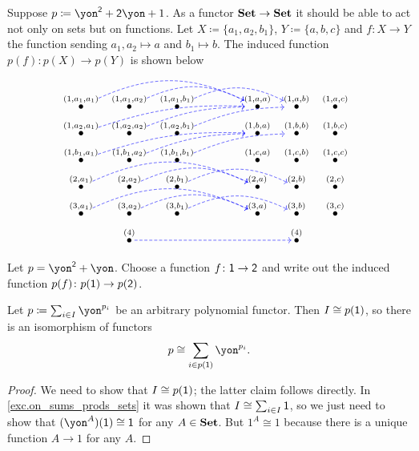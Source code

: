 \documentclass[DynamicalBook]{subfiles}
\begin{document}
\begin{example}
Suppose $p\coloneqq\yon^\2+\2\yon+1$. As a functor $\textbf{Set}\to\textbf{Set}$ it should be able to act not only on sets but on functions. Let $X\coloneqq\{a_1,a_2,b_1\}$, $Y\coloneqq\{a,b,c\}$ and $f\colon X\to Y$ the function sending $a_1,a_2\mapsto a$ and $b_1\mapsto b$. The induced function $p(f)\colon p(X)\to p(Y)$ is shown below
\[
\begin{tikzcd}[sep=3pt, shorten <=-5pt, shorten >=-5pt, dashed]
\LMO{(1,a_1,a_1)}\ar[rrrr, blue, bend left=25pt]&\LMO{(1,a_1,a_2)}\ar[rrr, blue, bend left=25pt]&\LMO{(1,a_1,b_1)}\ar[rrr, blue, bend left=25pt]&[30pt]&
\LMO{(1,a,a)}&\LMO{(1,a,b)}&\LMO{(1,a,c)}&&
\\
\LMO{(1,a_2,a_1)}\ar[rrrru, blue, bend left=10pt]&\LMO{(1,a_2,a_2)}\ar[rrru, blue, bend left=10pt]&\LMO{(1,a_2,b_1)}\ar[rrru, blue, bend left=10pt]&&
\LMO{(1,b,a)}&\LMO{(1,b,b)}&\LMO{(1,b,c)}&&
\\
\LMO{(1,b_1,a_1)}\ar[rrrru, blue, bend left=10pt]&\LMO{(1,b_1,a_2)}\ar[rrru, blue, bend left=10pt]&\LMO{(1,b_1,b_1)}\ar[rrru, blue, bend left=10pt]&&
\LMO{(1,c,a)}&\LMO{(1,c,b)}&\LMO{(1,c,c)}&&
\\
\LMO{(2,a_1)}\ar[rrrr, blue, bend left=25pt]&\LMO{(2,a_2)}\ar[rrr, blue, bend left=25pt]&\LMO{(2,b_1)}\ar[rrr, blue, bend left=25pt]&&
\LMO{(2,a)}&\LMO{(2,b)}&\LMO{(2,c)}&&
\\
\LMO{(3,a_1)}\ar[rrrr, blue, bend left=25pt]&\LMO{(3,a_2)}\ar[rrr, blue, bend left=25pt]&\LMO{(3,b_1)}\ar[rrr, blue, bend left=25pt]&&
\LMO{(3,a)}&\LMO{(3,b)}&\LMO{(3,c)}&&
\\&
\LMO{(4)}\ar[rrrr, blue]&&&&\LMO{(4)}
\end{tikzcd}
\]
\end{example}

\begin{exercise}
Let $p=\yon^\2+\yon$. Choose a function $f\colon\textsf{1}\to\textsf{2}$ and write out the induced function $p(f)\colon p(\textsf{1})\to p(\textsf{2})$.
\end{exercise}

\begin{proposition}\label{prop.apply1}
Let $p\coloneqq\sum_{i\in I}\yon^{p_i}$ be an arbitrary polynomial functor. Then $I\cong p(\textsf{1})$, so there is an isomorphism of functors
\begin{equation}\label{eqn.sum_p1}
p\cong\sum_{i\in p(\1)}\yon^{p_i}.
\end{equation}
\end{proposition}
\begin{proof}
We need to show that $I\cong p(\textsf{1})$; the latter claim follows directly. In \cref{exc.on_sums_prods_sets} it was shown that $I\cong\sum_{i\in I}\textsf{1}$, so we just need to show that $(\yon^A)(\1)\cong\1$ for any $A\in\textbf{Set}$. But $1^A\cong 1$ because there is a unique function $A\to 1$ for any $A$.
\end{proof}
\end{document}
